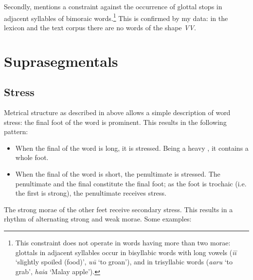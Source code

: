 

\clearpage 
Secondly, \citet{Davletshin2015} mentions a constraint against the occurrence of glottal stops in adjacent syllables of bimoraic words.\footnote{\label{fn:57}This constraint does not operate in words having more than two morae: glottals in adjacent syllables occur in bisyllabic words with long vowels (\textit{{\ꞌ}ī{\ꞌ}ī} ‘slightly spoiled (food)’, \textit{{\ꞌ}u{\ꞌ}ū} ‘to groan’), and in trisyllabic words (\textit{{\ꞌ}a{\ꞌ}aru} ‘to grab’, \textit{ha{\ꞌ}i{\ꞌ}a} ‘Malay apple’).} This is confirmed by my data: in the lexicon and the text corpus there are no words of the shape \textit{{\ꞌ}V{\ꞌ}V}.

\section{Suprasegmentals}\label{sec:2.4}
\subsection{Stress}\label{sec:2.4.1}
Metrical structure as described in  above allows a simple description of word stress: the final foot of the word is prominent. This results in the following pattern:

\begin{itemize}
\item 
When the final  of the word is long, it is stressed. Being a heavy , it contains a whole foot.

\item 
When the final  of the word is short, the penultimate  is stressed. The penultimate and the final  constitute the final foot; as the foot is trochaic (i.e. the first  is strong), the penultimate receives stress. 

\end{itemize}

The strong morae of the other feet receive secondary stress. This results in a rhythm of alternating strong and weak morae. Some examples:

